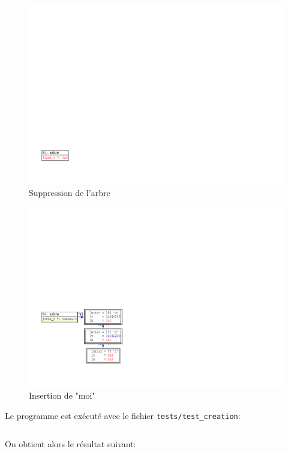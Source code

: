 	\begin{figure}[H]
		\centering \includegraphics[scale=0.82,trim=1cm 2cm 24.5cm 16cm,clip=true]{../tests/ddd_suppression}
		\caption{Suppression de l'arbre}
	\end{figure}
	\begin{figure}[H]
		\centering \includegraphics[scale=0.82,trim=1cm 2.5cm 18cm 11cm,clip=true]{../tests/ddd_insertion_moi}
		\caption{Insertion de "moi"}
	\end{figure}

	Le programme est exécuté avec le fichier \texttt{tests/test\_creation}:
	\inputminted[frame=single,label=Test]{text}{../tests/test_creation}
	\newpage
	On obtient alors le résultat suivant: 
	\inputminted[breaklines=true,frame=single,label=Resultat]{text}{../tests/resultat_test_creation}

